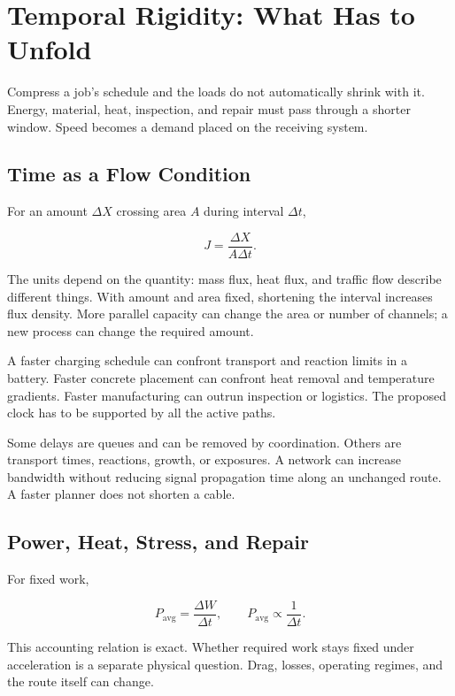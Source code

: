 \documentclass[11pt,openany]{book}
\begin{document}
\section{Temporal Rigidity: What Has to Unfold}

Compress a job's schedule and the loads do not automatically shrink with it. Energy, material, heat, inspection, and repair must pass through a shorter window. Speed becomes a demand placed on the receiving system.

\subsection{Time as a Flow Condition}

For an amount $\Delta X$ crossing area $A$ during interval $\Delta t$,

\begin{equation}
J=\frac{\Delta X}{A\Delta t}.
\label{eq:flux}
\end{equation}

The units depend on the quantity: mass flux, heat flux, and traffic flow describe different things. With amount and area fixed, shortening the interval increases flux density. More parallel capacity can change the area or number of channels; a new process can change the required amount.

A faster charging schedule can confront transport and reaction limits in a battery. Faster concrete placement can confront heat removal and temperature gradients. Faster manufacturing can outrun inspection or logistics. The proposed clock has to be supported by all the active paths.

Some delays are queues and can be removed by coordination. Others are transport times, reactions, growth, or exposures. A network can increase bandwidth without reducing signal propagation time along an unchanged route. A faster planner does not shorten a cable.

\subsection{Power, Heat, Stress, and Repair}

For fixed work,

\begin{equation}
P_{\mathrm{avg}}=\frac{\Delta W}{\Delta t},
\qquad
P_{\mathrm{avg}}\propto\frac{1}{\Delta t}.
\end{equation}

This accounting relation is exact. Whether required work stays fixed under acceleration is a separate physical question. Drag, losses, operating regimes, and the route itself can change.
\end{document}
